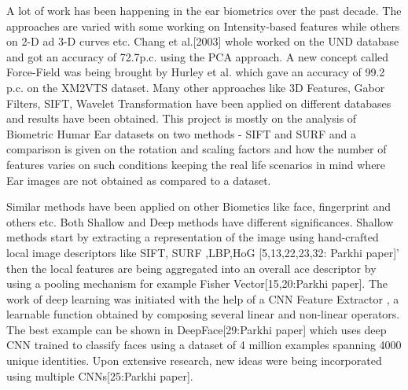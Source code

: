 
A lot of work has been happening in the ear biometrics over the past decade. The approaches are varied with some working on Intensity-based features while others on 2-D ad 3-D curves etc. Chang et al.[2003] whole worked on the UND database and got an accuracy of 72.7p.c. using the PCA approach. A new concept called Force-Field was being brought by Hurley et al. which gave an accuracy of 99.2 p.c. on the XM2VTS dataset. Many other approaches like 3D Features, Gabor Filters, SIFT, Wavelet Transformation have been applied on different databases and results have been obtained. This project is mostly on the analysis of Biometric Humar Ear datasets on two methods - SIFT and SURF and a comparison is given on the rotation and scaling factors and how the number of features varies on such conditions keeping the real life scenarios in mind where Ear images are not obtained as compared to a dataset.

Similar methods have been applied on other Biometics like face, fingerprint and others etc. Both Shallow and Deep methods have different significances. Shallow methods start by extracting a representation of the image using hand-crafted local image descriptors like SIFT, SURF ,LBP,HoG [5,13,22,23,32: Parkhi paper]' then the local features are being aggregated into an overall ace descriptor by using a pooling mechanism for example Fisher Vector[15,20:Parkhi paper]. The work of deep learning was initiated with the help of a CNN Feature Extractor , a learnable function obtained by composing several linear and non-linear operators. The best example can be shown in DeepFace[29:Parkhi paper] which uses deep CNN trained to classify faces using a dataset of 4 million examples spanning 4000 unique identities. Upon extensive research, new ideas were being incorporated using multiple CNNs[25:Parkhi paper].

